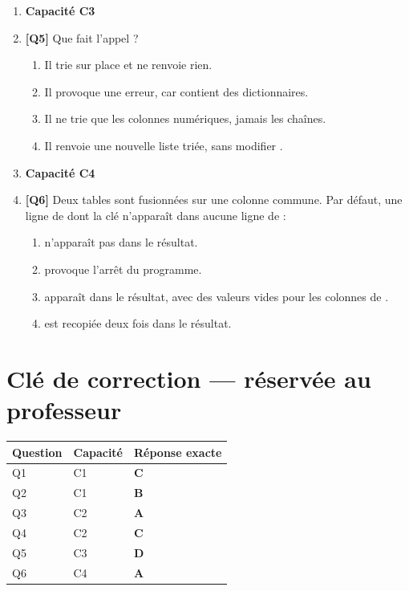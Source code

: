 \begin{enumerate}
\item[] \textbf{Capacité C3}

\item \textbf{[Q5]} Que fait l'appel  ?
  \begin{enumerate}[label=\Alph*.]
    \item Il trie  sur place et ne renvoie rien.
    \item Il provoque une erreur, car  contient des dictionnaires.
    \item Il ne trie que les colonnes numériques, jamais les chaînes.
    \item Il renvoie une nouvelle liste triée, sans modifier .
  \end{enumerate}

\item[] \textbf{Capacité C4}

\item \textbf{[Q6]} Deux tables sont fusionnées sur une colonne commune. Par défaut, une ligne de  dont la clé n'apparaît dans aucune ligne de  :
  \begin{enumerate}[label=\Alph*.]
    \item n'apparaît pas dans le résultat.
    \item provoque l'arrêt du programme.
    \item apparaît dans le résultat, avec des valeurs vides pour les colonnes de .
    \item est recopiée deux fois dans le résultat.
  \end{enumerate}

\end{enumerate}

\ifnxVersionProfesseur
\clearpage
\section*{Clé de correction — réservée au professeur}

\begin{center}
\begin{tabular}{lll}
\hline
Question & Capacité & Réponse exacte \\
\hline
Q1 & C1 & \textbf{C} \\
Q2 & C1 & \textbf{B} \\
Q3 & C2 & \textbf{A} \\
Q4 & C2 & \textbf{C} \\
Q5 & C3 & \textbf{D} \\
Q6 & C4 & \textbf{A} \\
\hline
\end{tabular}
\end{center}


